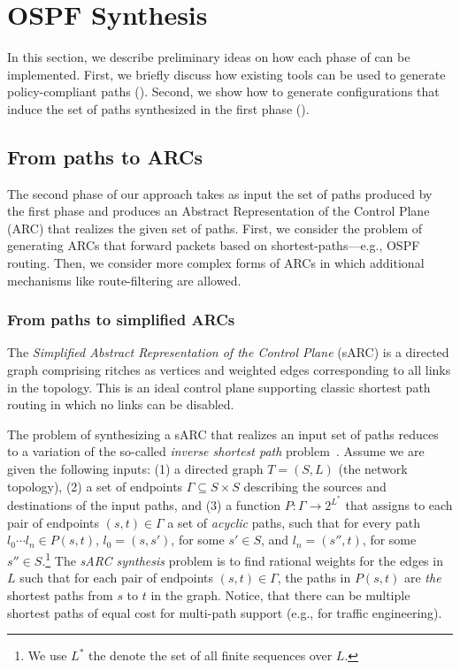 \section{OSPF Synthesis} \label{sec:synthesis}
In this section, we describe preliminary ideas on how each phase of 
 can be implemented.
First, we briefly discuss how existing tools can be used to generate
policy-compliant paths ().
Second, we show how to generate configurations that induce
the set of paths synthesized in the first phase ().


\subsection{From paths to ARCs} \label{sec:phase2}

The second phase of our approach takes as input the set of paths produced by the first phase
and produces an Abstract Representation of the Control Plane (ARC) that realizes the given set of paths.
First, we consider the problem of generating ARCs that
 forward packets based on shortest-paths---e.g., OSPF routing.
Then, we consider more complex forms of ARCs in which 
 additional mechanisms like route-filtering are allowed. 
 
\subsubsection{From paths to simplified ARCs} \label{sec:sarc}
The \emph{Simplified Abstract Representation of the Control Plane} (sARC) is a directed graph comprising ritches as 
vertices and weighted edges corresponding to all links in the
topology. 
This is an ideal control plane supporting classic shortest path routing in which no links can be disabled. 

The problem of synthesizing 
a sARC that realizes an input set of paths reduces to a
variation of the so-called {\em inverse shortest path} problem~\cite{isp}. 
Assume we are given the following inputs: (1) a directed graph $T = (S, L)$ (the network topology), 
(2) a set of endpoints $\Gamma \subseteq S\times S$
describing the sources and destinations of the input paths, and 
(3) a function $P: \Gamma \rightarrow 2^{L^*}$
that assigns to each pair of endpoints $(s,t) \in \Gamma$ 
a set of \emph{acyclic} paths, such that for every path $l_0\cdots l_n\in P(s,t)$,
$l_0=(s,s')$, for some $s'\in S$, and $l_n=(s'',t)$, for some $s''\in S$.\footnote{
We use $L^*$ the denote the set of all finite sequences over $L$.}
The 
\emph{sARC synthesis}
problem is to find rational weights for the edges in $L$ such that 
for each pair of endpoints $(s,t) \in \Gamma$, 
the paths in $P(s,t)$ are \emph{the} shortest paths from $s$ to $t$ 
in the graph. Notice, that there can be multiple shortest
paths of equal cost for multi-path support (e.g., for traffic engineering).

